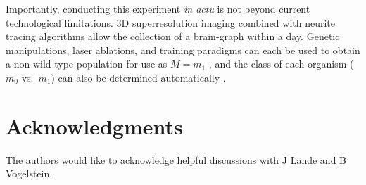 \documentclass[10pt]{article}
\newcommand{\mB}{\mathcal{B}}
\newcommand{\mM}{\mathcal{M}}
\newcommand{\hL}{\widehat{L}}
\newcommand{\MeB}{\mM \overset{\varepsilon}{{\sim}}_F \mB}
\providecommand{\tr}[1]{\textcolor{black}{#1}}
\begin{document}
Importantly, conducting this experiment {\it in actu} is not beyond current technological limitations. 3D superresolution imaging \cite{VaziriShank08} combined with neurite tracing algorithms \cite{HelmstaedterDenk08,Mishchenko09,LuLichtman09} allow the collection of a brain-graph within a day. Genetic manipulations, laser ablations, and training paradigms can each be used to obtain a non-wild type population for use as $M=m_1$ \cite{deBonoMaricq05}, and the class of each organism ($m_0$ vs.~$m_1$) can also be determined automatically \cite{BuckinghamSattelle08}.


\section*{Acknowledgments}

The authors would like to acknowledge helpful discussions with J Lande and B Vogelstein. 





% 


\end{document}
